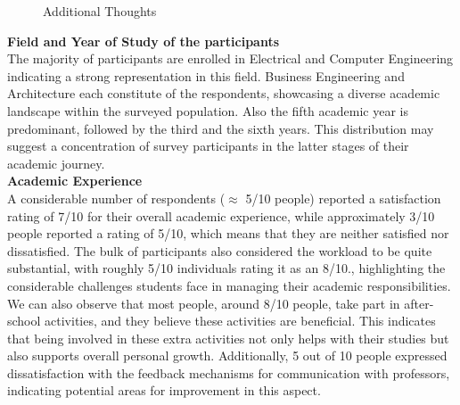 \documentclass[11pt]{report}
\begin{document}
\begin{figure}[htpb]
    \centering
    \caption{Additional Thoughts}
\end{figure}
\FloatBarrier
\noindent \textbf{Field and Year of Study of the participants} \\
The majority of participants are enrolled in Electrical and Computer Engineering indicating a strong representation in this field. Business Engineering and Architecture each constitute of the respondents, showcasing a diverse academic landscape within the surveyed population. Also the fifth academic year is predominant, followed by the third and the sixth years. This distribution may suggest a concentration of survey participants in the latter stages of their academic journey.\vspace{5mm} \\
\textbf{Academic Experience} \\
A considerable number of respondents ($\approx$ 5/10 people) reported a satisfaction rating of 7/10 for their overall academic experience, while approximately 3/10 people reported a rating of 5/10, which means that they are neither satisfied nor dissatisfied. The bulk of participants also considered the workload to be quite substantial, with roughly 5/10 individuals rating it as an 8/10., highlighting the considerable challenges students face in managing their academic responsibilities. We can also observe that most people, around 8/10 people, take part in after-school activities, and they believe these activities are beneficial. This indicates that being involved in these extra activities not only helps with their studies but also supports overall personal growth. Additionally, 5 out of 10 people expressed dissatisfaction with the feedback mechanisms for communication with professors, indicating potential areas for improvement in this aspect.\\ \\
\end{document}
